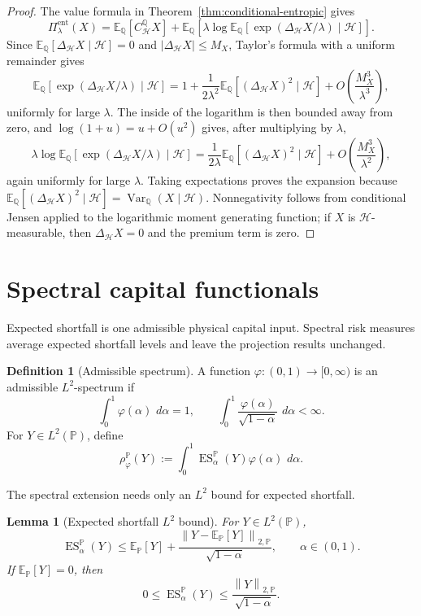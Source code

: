 \documentclass[11pt,a4paper]{amsart}
\theoremstyle{plain}
\newtheorem{lemma}[theorem]{Lemma}
\theoremstyle{definition}
\newtheorem{definition}[theorem]{Definition}
\theoremstyle{remark}
\DeclareMathOperator{\Var}{Var}
\newcommand{\PP}{\mathbb{P}}
\newcommand{\QQ}{\mathbb{Q}}
\newcommand{\EE}{\mathbb{E}}
\newcommand{\cH}{\mathcal{H}}
\newcommand{\dd}{\,d}
\newcommand{\norm}[1]{\left\lVert #1\right\rVert}
\newcommand{\ES}{\operatorname{ES}}
\begin{document}
\begin{proof}
The value formula in Theorem~\ref{thm:conditional-entropic} gives
\[
        \Pi_{\lambda}^{\mathrm{ent}}(X)
        =
        \EE_\QQ[C_{\cH}^{\QQ}X]
        +
        \EE_\QQ\!\left[
        \lambda\log \EE_\QQ[\exp(\Delta_{\cH}X/\lambda)\mid\cH]
        \right].
\]
Since \(\EE_\QQ[\Delta_{\cH}X\mid\cH]=0\) and \(|\Delta_{\cH}X|\le M_X\), Taylor's formula with a
uniform remainder gives
\[
        \EE_\QQ[\exp(\Delta_{\cH}X/\lambda)\mid\cH]
        =
        1+
        \frac{1}{2\lambda^2}\EE_\QQ[(\Delta_{\cH}X)^2\mid\cH]
        +
        O\!\left(\frac{M_X^3}{\lambda^3}\right),
\]
uniformly for large \(\lambda\).  The inside of the logarithm is then bounded away from zero, and
\(\log(1+u)=u+O(u^2)\) gives, after multiplying by \(\lambda\),
\[
        \lambda\log \EE_\QQ[\exp(\Delta_{\cH}X/\lambda)\mid\cH]
        =
        \frac{1}{2\lambda}\EE_\QQ[(\Delta_{\cH}X)^2\mid\cH]
        +
        O\!\left(\frac{M_X^3}{\lambda^2}\right),
\]
again uniformly for large \(\lambda\).  Taking expectations proves the expansion because
\(\EE_\QQ[(\Delta_{\cH}X)^2\mid\cH]=\Var_\QQ(X\mid\cH)\).  Nonnegativity follows from conditional
Jensen applied to the logarithmic moment generating function; if \(X\) is \(\cH\)-measurable, then
\(\Delta_{\cH}X=0\) and the premium term is zero.
\end{proof}

\section{Spectral capital functionals}\label{app:spectral}

Expected shortfall is one admissible physical capital input.  Spectral risk measures average
expected shortfall levels and leave the projection results unchanged.

\begin{definition}[Admissible spectrum]\label{def:admissible-spectrum}
A function \(\varphi:(0,1)\to[0,\infty)\) is an admissible \(L^2\)-spectrum if
\[
        \int_0^1\varphi(\alpha)\,\dd\alpha=1,
        \qquad
        \int_0^1\frac{\varphi(\alpha)}{\sqrt{1-\alpha}}\,\dd\alpha<\infty.
\]
For \(Y\in L^2(\PP)\), define
\[
        \rho_{\varphi}^{\PP}(Y)
        :=
        \int_0^1 \ES_\alpha^\PP(Y)\varphi(\alpha)\,\dd\alpha.
\]
\end{definition}

The spectral extension needs only an \(L^2\) bound for expected shortfall.

\begin{lemma}[Expected shortfall \(L^2\) bound]\label{lem:es-l2-bound}
For \(Y\in L^2(\PP)\),
\[
        \ES_\alpha^\PP(Y)
        \le
        \EE_\PP[Y]
        +
        \frac{\norm{Y-\EE_\PP[Y]}_{2,\PP}}{\sqrt{1-\alpha}},
        \qquad \alpha\in(0,1).
\]
If \(\EE_\PP[Y]=0\), then
\[
        0\le\ES_\alpha^\PP(Y)
        \le
        \frac{\norm{Y}_{2,\PP}}{\sqrt{1-\alpha}}.
\]
\end{lemma}
\end{document}
